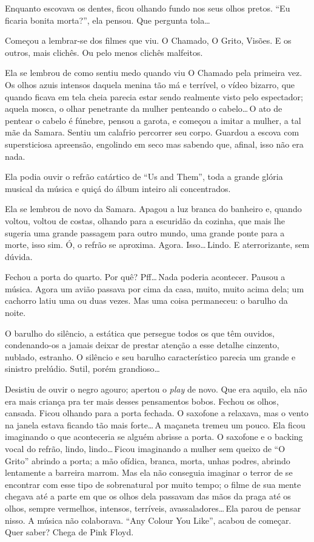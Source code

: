 Enquanto escovava os dentes, ficou olhando fundo nos seus olhos pretos. ``Eu ficaria bonita morta?'', ela pensou. Que pergunta tola\ldots

Começou a lembrar-se dos filmes que viu. O Chamado, O Grito, Visões. E os outros, mais clichês. Ou pelo menos clichês malfeitos.

Ela se lembrou de como sentiu medo quando viu O Chamado pela primeira vez. Os olhos azuis intensos daquela menina tão má e terrível, o vídeo bizarro, que quando ficava em tela cheia parecia estar sendo realmente visto pelo espectador; aquela mosca, o olhar penetrante da mulher penteando o cabelo\ldots\,O ato de pentear o cabelo é fúnebre, pensou a garota, e começou a imitar a mulher, a tal mãe da Samara. Sentiu um calafrio percorrer seu corpo. Guardou a escova com supersticiosa apreensão, engolindo em seco mas sabendo que, afinal, isso não era nada.

Ela podia ouvir o refrão catártico de ``Us and Them'', toda a grande glória musical da música e quiçá do álbum inteiro ali concentrados.

Ela se lembrou de novo da Samara. Apagou a luz branca do banheiro e, quando voltou, voltou de costas, olhando para a escuridão da cozinha, que mais lhe sugeria uma grande passagem para outro mundo, uma grande ponte para a morte, isso sim. Ó, o refrão se aproxima. Agora. Isso\ldots\,Lindo. E aterrorizante, sem dúvida.

Fechou a porta do quarto. Por quê? Pff\ldots\,Nada poderia acontecer. Pausou a música. Agora um avião passava por cima da casa, muito, muito acima dela; um cachorro latiu uma ou duas vezes. Mas uma coisa permaneceu: o barulho da noite.

O barulho do silêncio, a estática que persegue todos os que têm ouvidos, condenando-os a jamais deixar de prestar atenção a esse detalhe cinzento, nublado, estranho. O silêncio e seu barulho característico parecia um grande e sinistro prelúdio. Sutil, porém grandioso\ldots

Desistiu de ouvir o negro agouro; apertou o \emph{play} de novo. Que era aquilo, ela não era mais criança pra ter mais desses pensamentos bobos. Fechou os olhos, cansada. Ficou olhando para a porta fechada. O saxofone a relaxava, mas o vento na janela estava ficando tão mais forte\ldots\,A maçaneta tremeu um pouco. Ela ficou imaginando o que aconteceria se alguém abrisse a porta. O saxofone e o backing vocal do refrão, lindo, lindo\ldots\,Ficou imaginando a mulher sem queixo de ``O Grito'' abrindo a porta; a mão ofídica, branca, morta, unhas podres, abrindo lentamente a barreira marrom. Mas ela não conseguia imaginar o terror de se encontrar com esse tipo de sobrenatural por muito tempo; o filme de sua mente chegava até a parte em que os olhos dela passavam das mãos da praga até os olhos, sempre vermelhos, intensos, terríveis, avassaladores\ldots\,Ela parou de pensar nisso. A música não colaborava. \foreignlanguage{english}{``Any Colour You Like''}, acabou de começar. Quer saber? Chega de Pink Floyd.

